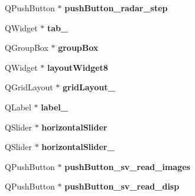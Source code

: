 \begin{DoxyCompactItemize}
\item 
\hypertarget{class_ui___main_window_aef8650db0d2b71afdbb1abc0194dd8c4}{}Q\+Push\+Button $\ast$ {\bfseries push\+Button\+\_\+radar\+\_\+step}\label{class_ui___main_window_aef8650db0d2b71afdbb1abc0194dd8c4}

\item 
\hypertarget{class_ui___main_window_a41c7e77dd12b9445e13dbe8fb5ae1488}{}Q\+Widget $\ast$ {\bfseries tab\+\_}\label{class_ui___main_window_a41c7e77dd12b9445e13dbe8fb5ae1488}

\item 
\hypertarget{class_ui___main_window_aef7cb3be8cecfc9aaf98f036a98781ce}{}Q\+Group\+Box $\ast$ {\bfseries group\+Box}\label{class_ui___main_window_aef7cb3be8cecfc9aaf98f036a98781ce}

\item 
\hypertarget{class_ui___main_window_a11715b413537235bc73b0f013c334d3b}{}Q\+Widget $\ast$ {\bfseries layout\+Widget8}\label{class_ui___main_window_a11715b413537235bc73b0f013c334d3b}

\item 
\hypertarget{class_ui___main_window_a4495f53e7dd496615426ada2042c051b}{}Q\+Grid\+Layout $\ast$ {\bfseries grid\+Layout\+\_}\label{class_ui___main_window_a4495f53e7dd496615426ada2042c051b}

\item 
\hypertarget{class_ui___main_window_a29b781f23566d0f91b217459c06929ba}{}Q\+Label $\ast$ {\bfseries label\+\_}\label{class_ui___main_window_a29b781f23566d0f91b217459c06929ba}

\item 
\hypertarget{class_ui___main_window_ae0d25af9b3ed9386441e76f06d3f3ddb}{}Q\+Slider $\ast$ {\bfseries horizontal\+Slider}\label{class_ui___main_window_ae0d25af9b3ed9386441e76f06d3f3ddb}

\item 
\hypertarget{class_ui___main_window_a7d1e73d93735ae30872e496b475bd45b}{}Q\+Slider $\ast$ {\bfseries horizontal\+Slider\+\_}\label{class_ui___main_window_a7d1e73d93735ae30872e496b475bd45b}

\item 
\hypertarget{class_ui___main_window_adf73d4c9dedf503c14d35d44c57e169e}{}Q\+Push\+Button $\ast$ {\bfseries push\+Button\+\_\+sv\+\_\+read\+\_\+images}\label{class_ui___main_window_adf73d4c9dedf503c14d35d44c57e169e}

\item 
\hypertarget{class_ui___main_window_a2ac5fbe45a889e1ae917b7276b20bd1c}{}Q\+Push\+Button $\ast$ {\bfseries push\+Button\+\_\+sv\+\_\+read\+\_\+disp}\label{class_ui___main_window_a2ac5fbe45a889e1ae917b7276b20bd1c}


\end{DoxyCompactItemize}

